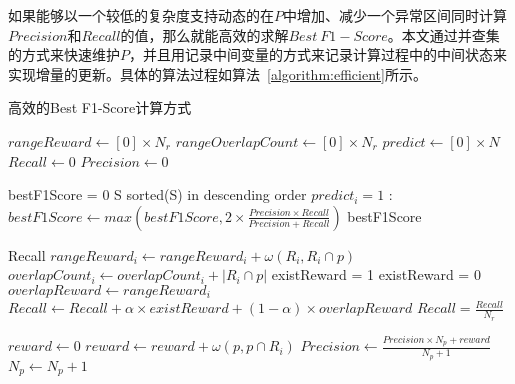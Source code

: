   如果能够以一个较低的复杂度支持动态的在$P$中增加、减少一个异常区间同时计算$Precision$和$Recall$的值，那么就能高效的求解$Best\ F1-Score$。本文通过并查集的方式来快速维护$P$，并且用记录中间变量的方式来记录计算过程中的中间状态来实现增量的更新。具体的算法过程如算法~\ref{algorithm:efficient}所示。

  \begin{breakablealgorithm}
    \caption{高效的Best F1-Score计算方式}
    \label{algorithm:efficient}
    \begin{algorithmic}[1]
      \State $rangeReward \gets [0] \times N_r$
      \State $rangeOverlapCount \gets [0] \times N_r$
      \State $predict \gets [0] \times N$
      \State $Recall \gets 0$
      \State $Precision \gets 0$

      \State

      \State bestF1Score = 0
      \State S \gets sorted(S) in descending order
      \State $predict_i = 1$
          \State {}
          \State {}
      \EndIf
      :
          \State {}
          \State {}
      \EndIf
      \State {}
      \State $bestF1Score \gets max(bestF1Score, 2\times\frac{Precision \times Recall}{Precision + Recall})$
      \EndFor
      \State \Return bestF1Score
      \EndFunction
      
      \State

      \State Recall 
            \State $rangeReward_i \gets rangeReward_i + \omega(R_i,R_i \cap p)$
            \State $overlapCount_i \gets overlapCount_i +  |R_i\cap p|$
              \State existReward = 1
            \Else
              \State existReward = 0
            \EndIf
            \State $overlapReward \gets rangeReward_i$
            \State $Recall \gets Recall + \alpha \times existReward + (1-\alpha) \times overlapReward$
      \EndFor
      \State $Recall = \frac{Recall}{N_r}$

      \State

      \State $reward \gets 0$
            \State $reward \gets reward  + \omega(p, p \cap R_i)$
      \EndFor
      \State $Precision \gets \frac{Precision \times N_p + reward}{N_p + 1}$
      \State $N_p \gets N_p + 1$
      \EndFunction


\end{algorithmic}
\end{breakablealgorithm}
